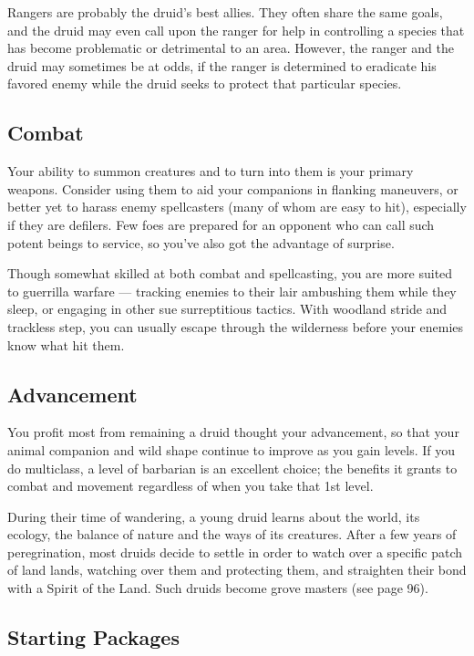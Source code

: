 Rangers are probably the druid's best allies. They often share the same goals, and the druid may even call upon the ranger for help in controlling a species that has become problematic or detrimental to an area. However, the ranger and the druid may sometimes be at odds, if the ranger is determined to eradicate his favored enemy while the druid seeks to protect that particular species.

\subsection{Combat}

Your ability to summon creatures and to turn into them is your primary weapons. Consider using them to aid your companions in flanking maneuvers, or better yet to harass enemy spellcasters (many of whom are easy to hit), especially if they are defilers. Few foes are prepared for an opponent who can call such potent beings to service, so you've also got the advantage of surprise.

Though somewhat skilled at both combat and spellcasting, you are more suited to guerrilla warfare — tracking enemies to their lair ambushing them while they sleep, or engaging in other sue surreptitious tactics. With woodland stride and trackless step, you can usually escape through the wilderness before your enemies know what hit them.

\subsection{Advancement}

You profit most from remaining a druid thought your advancement, so that your animal companion and wild shape continue to improve as you gain levels. If you do multiclass, a level of barbarian is an excellent choice; the benefits it grants to combat and movement regardless of when you take that 1st level.

During their time of wandering, a young druid learns about the world, its ecology, the balance of nature and the ways of its creatures. After a few years of peregrination, most druids decide to settle in order to watch over a specific patch of land lands, watching over them and protecting them, and straighten their bond with a Spirit of the Land. Such druids become grove masters (see page 96).

\subsection{Starting Packages}

